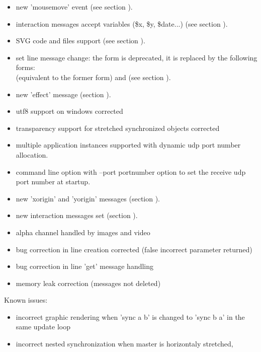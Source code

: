 \begin{itemize}
\item new 'mousemove' event (see section ).
\item interaction messages accept variables (\$x, \$y, \$date...) (see section ).
\item SVG code and files support (see section ).
\item set line message change: the  form is deprecated, it is replaced by
  the following forms: \\
   (equivalent to the former form) 
  and    
  (see section ).
\item new 'effect' message  (section ).
\item utf8 support on windows corrected
\item transparency support for stretched synchronized objects corrected
\item multiple application instances supported with dynamic udp port number allocation.
\item command line option with --port portnumber option to set the receive udp port number at startup.
\end{itemize}

\begin{itemize}
\item new 'xorigin' and 'yorigin' messages (section ).
\item new interaction messages set (section ).
\item alpha channel handled by images and video
\item bug correction in line creation corrected (false incorrect parameter returned)
\item bug correction in line 'get' message handling
\item memory leak correction (messages not deleted)
\end{itemize}

Known issues: 
\begin{itemize}
\item incorrect graphic rendering when 'sync a b' is changed to 'sync b a' in the same update loop
\item incorrect nested synchronization when master is horizontaly stretched,
\end{itemize}

